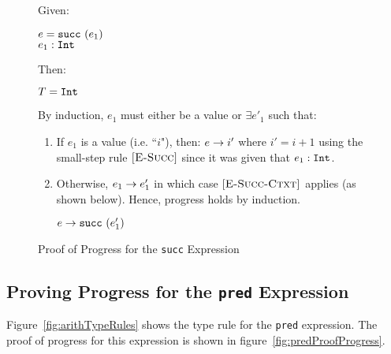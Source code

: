 \documentclass{report}
\newcommand{\rel}[1]{\mbox{\sc [#1]}}
\begin{document}
\begin{figure}[ht!]
Given:
\begin{center}
  $e = \mbox{\tt succ}~(e_1)$ \\
   ${e_1} : {\mbox{\tt Int}}$
\end{center}
Then:~\\
\begin{center}
   $T = \mbox{\tt Int}$
\end{center}

By induction, $e_1$ must either be a value or $\exists e'_1$ such that:~\\

	\begin{enumerate}
    \item If $e_1$ is a value (i.e. ``$i$"), then: ${e} \rightarrow {i'}$ where $i' = i + 1$ using the small-step rule $\rel{E-Succ}$ since it was given that ${e_1} : {\mbox{\tt Int}}$.
      
    \item Otherwise, ${e_1} \rightarrow {e'_1}$ in which case $\rel{E-Succ-Ctxt}$ applies (as shown below). Hence, progress holds by induction.
    
    \begin{center}
      ${e} \rightarrow {\mbox{\tt succ}~(e'_1)}$
    \end{center}
	
	\end{enumerate}
	
  \caption{Proof of Progress for the \texttt{succ} Expression}\label{fig:succProofProgress}
\end{figure}


\subsection{Proving Progress for the \texttt{pred} Expression}

Figure~\ref{fig:arithTypeRules} shows the type rule for the \texttt{pred} expression.  The proof of progress for this expression is shown in figure~\ref{fig:predProofProgress}.
\end{document}
